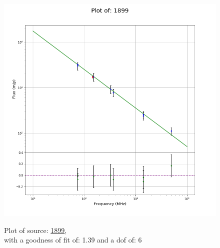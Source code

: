 \documentclass{article}
\begin{document}
\begin{figure}[H]
    \centering
    \begin{minipage}{.5\textwidth}
        \centering
        \includegraphics[scale = 0.35]{KmeulenTrap4P23_1hr/1hr1899.png}
        \captionsetup{labelformat=empty}
        \caption{Plot of source: \href{http://banana.transientskp.org/r4/vlo_KmeulenTrap4P23/runningcatalog/1899}{1899},\\with a goodness of fit of: 1.39 and a dof of: 6}
        \addtocounter{figure}{-1}
        \label{KmeulenTrap4P23:1hr:1899:plot}
    \end{minipage}%
    \begin{minipage}{0.5\textwidth}
        \centering


\end{minipage}
\end{figure}
\end{document}

